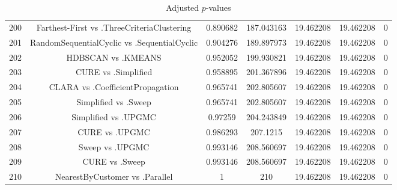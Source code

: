 \documentclass[a4paper,10pt]{article}
\begin{document}
\begin{landscape}
\begin{table}[!htp]
\begin{tabular}{ccccccc}
200&Farthest-First vs .ThreeCriteriaClustering&0.890682&187.043163&19.462208&19.462208&0\\
201&RandomSequentialCyclic vs .SequentialCyclic&0.904276&189.897973&19.462208&19.462208&0\\
202&HDBSCAN vs .KMEANS&0.952052&199.930821&19.462208&19.462208&0\\
203&CURE vs .Simplified&0.958895&201.367896&19.462208&19.462208&0\\
204&CLARA vs .CoefficientPropagation&0.965741&202.805607&19.462208&19.462208&0\\
205&Simplified vs .Sweep&0.965741&202.805607&19.462208&19.462208&0\\
206&Simplified vs .UPGMC&0.97259&204.243849&19.462208&19.462208&0\\
207&CURE vs .UPGMC&0.986293&207.1215&19.462208&19.462208&0\\
208&Sweep vs .UPGMC&0.993146&208.560697&19.462208&19.462208&0\\
209&CURE vs .Sweep&0.993146&208.560697&19.462208&19.462208&0\\
210&NearestByCustomer vs .Parallel&1&210&19.462208&19.462208&0\\
\hline
\end{tabular}
\caption{Adjusted $p$-values}
\end{table}

\end{landscape}
\end{document}
